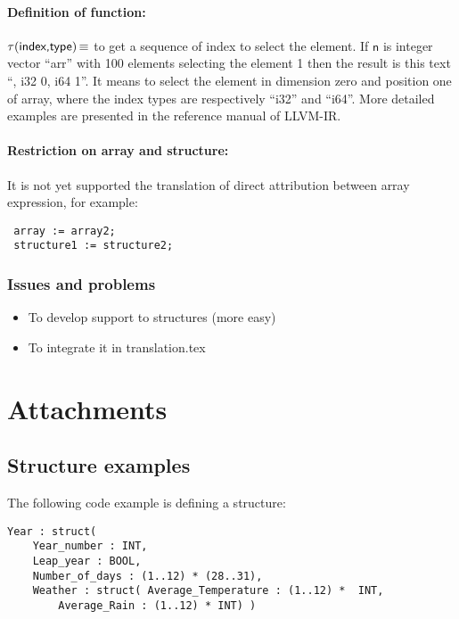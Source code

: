 \documentclass[10pt,a4paper]{article}
\DeclareMathOperator{\isdef}{\equiv}
\newcommand{\B}[1]{\textsf{#1}}
\newcommand{\stateindex}[0]{\ensuremath{\sf\tau}}
\begin{document}
\paragraph{Definition of function:} $\stateindex(\B{index,type}) \isdef$ to get a 
sequence of index to select the element. If $\B{n} $ is integer vector ``arr'' 
with 100 elements selecting the element 1 then the result is this text ``, i32 
0, i64 1''. It means to select the element in dimension zero and position one of 
array, where the index types are respectively ``i32'' and ``i64''. More detailed 
examples are presented in the reference manual of LLVM-IR. %

\paragraph{Restriction on array and structure:} It is not yet supported the 
translation of direct attribution between array expression, for example:

\begin{verbatim}
 array := array2;
 structure1 := structure2;
\end{verbatim}



\subsubsection{Issues and problems}
\begin{itemize}
	\item To develop support to structures (more easy)
	\item To integrate it in translation.tex
\end{itemize}


\section*{Attachments}

\subsection{Structure examples}

The following code example is defining a structure:

\begin{verbatim}
Year : struct(
	Year_number : INT,
	Leap_year : BOOL,
	Number_of_days : (1..12) * (28..31),
	Weather : struct( Average_Temperature : (1..12) *  INT,
		Average_Rain : (1..12) * INT) )
\end{verbatim}
\end{document}
